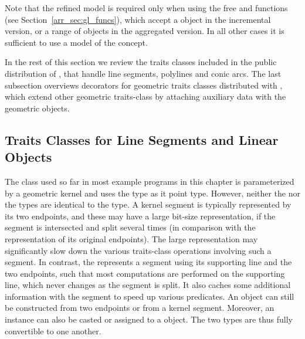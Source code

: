 Note that the refined model  is required
only when using the free  and
 functions (see Section~\ref{arr_sec:gl_funcs}),
which accept a  object in the incremental version,
or a range of  objects in the aggregated version.
In all other cases it is sufficient to use a model of the
 concept.

In the rest of this section we review the traits classes
included in the public distribution of \cgal, that handle line
segments, polylines and conic arcs. The last subsection overviews
decorators for geometric traits classes distributed with \cgal,
which extend other geometric traits-class by attaching auxiliary
data with the geometric objects.

\subsection{Traits Classes for Line Segments and Linear Objects\label{arr_ssec:tr_segs}}

The  class used so far
in most example programs in this chapter is parameterized by a
geometric kernel and uses the  type as it
point type. However, neither the  nor the
 types are identical to the
 type. A kernel segment is typically
represented by its two endpoints, and these may have a large bit-size
representation, if the segment is intersected and split several
times (in comparison with the representation of its original
endpoints). The large representation may significantly slow down the
various traits-class operations involving such a segment. In contrast,
the  represents a segment using
its supporting line and the two endpoints, such that most computations
are performed on the supporting line, which never changes as the
segment is split. It also caches some additional information with
the segment to speed up various predicates.
An  object can still be constructed from two
endpoints or from a kernel segment. Moreover, an
 instance can also be casted or assigned to a
 object. The two types are thus fully
convertible to one another.

